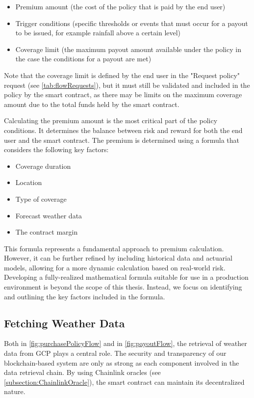 \begin{itemize}
    \item Premium amount (the cost of the policy that is paid by the end user)
    \item Trigger conditions (specific thresholds or events that must occur for a payout to be issued, for example rainfall above a certain level)
    \item Coverage limit (the maximum payout amount available under the policy in the case the conditions for a payout are met)
\end{itemize}

Note that the coverage limit is defined by the end user in the "Request policy" request (see \cref{tab:flowRequests}), but it must still be validated and included in the policy by the smart contract, as there may be limits on the maximum coverage amount due to the total funds held by the smart contract.

Calculating the premium amount is the most critical part of the policy conditions. It determines the balance between risk and reward for both the end user and the smart contract. The premium is determined using a formula that considers the following key factors:

\begin{itemize}
    \item Coverage duration
    \item Location
    \item Type of coverage
    \item Forecast weather data
    \item The contract margin
\end{itemize}

This formula represents a fundamental approach to premium calculation. However, it can be further refined by including historical data and actuarial models, allowing for a more dynamic calculation based on real-world risk. Developing a fully-realized mathematical formula suitable for use in a production environment is beyond the scope of this thesis. Instead, we focus on identifying and outlining the key factors included in the formula.

\subsection{Fetching Weather Data}
Both in \cref{fig:purchasePolicyFlow} and in \cref{fig:payoutFlow}, the retrieval of weather data from GCP plays a central role. The security and transparency of our blockchain-based system are only as strong as each component involved in the data retrieval chain. By using Chainlink oracles (see \cref{subsection:ChainlinkOracle}), the smart contract can maintain its decentralized nature.

